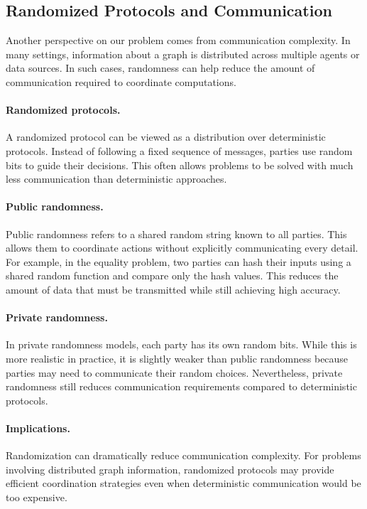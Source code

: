 \subsection{Randomized Protocols and Communication}

Another perspective on our problem comes from communication complexity. In many
settings, information about a graph is distributed across multiple agents or
data sources. In such cases, randomness can help reduce the amount of
communication required to coordinate computations.

\paragraph{Randomized protocols.}
A randomized protocol can be viewed as a distribution over deterministic
protocols. Instead of following a fixed sequence of messages, parties use random
bits to guide their decisions. This often allows problems to be solved with much
less communication than deterministic approaches.

\paragraph{Public randomness.}
Public randomness refers to a shared random string known to all parties. This
allows them to coordinate actions without explicitly communicating every detail.
For example, in the equality problem, two parties can hash their inputs using a
shared random function and compare only the hash values. This reduces the amount
of data that must be transmitted while still achieving high accuracy.

\paragraph{Private randomness.}
In private randomness models, each party has its own random bits. While this is
more realistic in practice, it is slightly weaker than public randomness because
parties may need to communicate their random choices. Nevertheless, private
randomness still reduces communication requirements compared to deterministic
protocols.

\paragraph{Implications.}
Randomization can dramatically reduce communication complexity. For problems
involving distributed graph information, randomized protocols may provide
efficient coordination strategies even when deterministic communication would
be too expensive.

